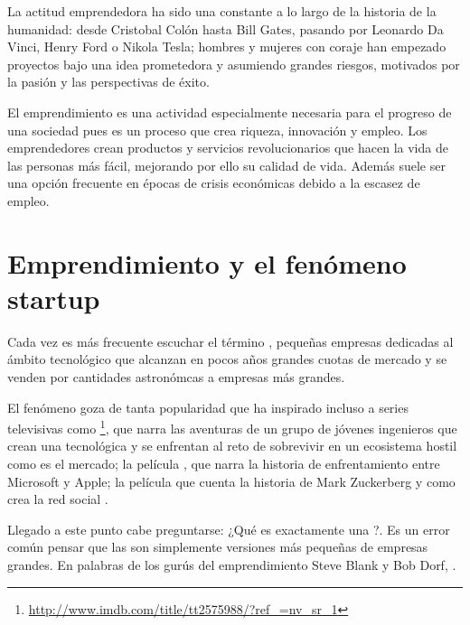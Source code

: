 La actitud emprendedora ha sido una constante a lo largo de la historia de la humanidad: desde Cristobal Colón hasta Bill Gates, pasando por Leonardo Da Vinci, Henry Ford o Nikola Tesla; hombres y mujeres con coraje han empezado proyectos bajo una idea prometedora y asumiendo grandes riesgos, motivados por la pasión y las perspectivas de éxito. 

El emprendimiento es una actividad especialmente necesaria para el progreso de una sociedad pues es un proceso que crea riqueza, innovación y empleo. Los emprendedores crean productos y servicios revolucionarios que hacen la vida de las personas más fácil, mejorando por ello su calidad de vida. Además suele ser una opción frecuente en épocas de crisis económicas debido a la escasez de empleo.

\section{Emprendimiento y el fenómeno startup}

Cada vez es más frecuente escuchar el término , pequeñas empresas dedicadas al ámbito tecnológico que alcanzan en pocos años grandes cuotas de mercado y se venden por cantidades astronómcas a empresas más grandes.

El fenómeno goza de tanta popularidad que ha inspirado incluso a series televisivas como \footnote{\url{http://www.imdb.com/title/tt2575988/?ref_=nv_sr_1}}, que narra las aventuras de un grupo de jóvenes ingenieros que crean una  tecnológica y se enfrentan al reto de sobrevivir en un ecosistema hostil como es el mercado; la película , que narra la historia de enfrentamiento entre Microsoft y Apple; la película  que cuenta la historia de Mark Zuckerberg y como crea la red social .

Llegado a este punto cabe preguntarse: ¿Qué es exactamente una ?. Es un error común pensar que las  son simplemente versiones más pequeñas de empresas grandes. En palabras de los gurús del emprendimiento Steve Blank y Bob Dorf, \cite{steveblankbobdorf2013}.

